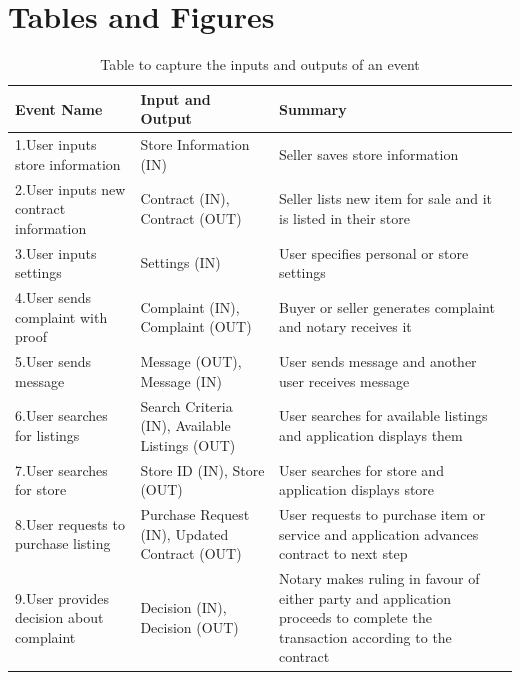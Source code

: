 \documentclass{article}
\begin{document}
\section{Tables and Figures}
\begin{table}[h!]
\color{red}
\centering
\begin{tabu} to 0.8\textwidth {|| X[l] | X[l] | X[l] ||}
 \hline
 \textbf {Event Name} & \textbf{Input and Output} & \textbf{Summary} \\
 \hline
 1.User inputs store information & Store Information (IN) & Seller saves store information \\
 \hline
 2.User inputs new contract information & Contract (IN), Contract (OUT) & Seller lists new item for sale and it is listed in their store \\
 \hline
 3.User inputs settings & Settings (IN) & User specifies personal or store settings \\
 \hline
 4.User sends complaint with proof & Complaint (IN), Complaint (OUT) & Buyer or seller generates complaint and notary receives it \\
 \hline
 5.User sends message & Message (OUT), Message (IN) & User sends message and another user receives message \\
 \hline
 6.User searches for listings & Search Criteria (IN), Available Listings (OUT) & User searches for available listings and application displays them \\
 \hline
 7.User searches for store & Store ID (IN), Store (OUT) & User searches for store and application displays store \\
 \hline
 8.User requests to purchase listing & Purchase Request (IN), Updated Contract (OUT) & User requests to purchase item or service and application advances contract to next step \\
 \hline
 9.User provides decision about complaint & Decision (IN), Decision (OUT) & Notary makes ruling in favour of either party and application proceeds to complete the transaction according to the contract \\
 \hline
\end{tabu}
\caption{Table to capture the inputs and outputs of an event}
\label{table:2}
\end{table}
\end{document}

